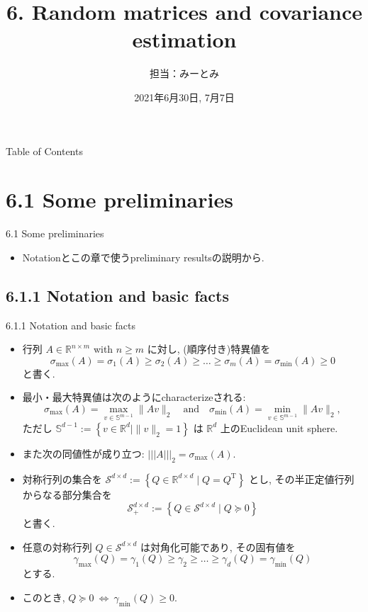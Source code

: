 \documentclass[unicode,aspectratio=169,11pt]{beamer}
\title{6. Random matrices and covariance estimation}
\author{担当：みーとみ}
\date{2021年6月30日, 7月7日}
\newcommand{\bb}{\mathbb}
\newcommand{\cc}{\mathcal}
\newcommand{\tr}{\mathrm{T}}
\begin{document}
\maketitle

\begin{frame}{Table of Contents}{}
    \setcounter{tocdepth}{1}
    \tableofcontents
\end{frame}

\section{6.1 Some preliminaries}
\begin{frame}{6.1 Some preliminaries}
  \begin{itemize}
    \item Notationとこの章で使うpreliminary resultsの説明から.
  \end{itemize}
\end{frame}

\subsection{6.1.1 Notation and basic facts}
\begin{frame}{6.1.1 Notation and basic facts}{}
  \begin{itemize}
    \item 行列 $A \in \bb{R}^{n \times m}$ with $n \ge m$ に対し, (順序付き)特異値を
    \[ \sigma_{\max}(A) = \sigma_1(A) \ge \sigma_2(A) \ge \dots \ge \sigma_m(A) = \sigma_{\min}(A) \ge 0 \]
    と書く.
    \item 最小・最大特異値は次のようにcharacterizeされる:
    \[ \sigma_{\max}(A) = \max_{v \in \bb{S}^{m-1}}\| Av \|_2 \quad \mathrm{and} \quad \sigma_{\min}(A) = \min_{v \in \bb{S}^{m-1}}\|Av\|_2, \tag{6.1} \]
    ただし $\bb{S}^{d-1} := \left\{ v \in \bb{R}^d \mid \|v\|_2 = 1 \right\}$ は $\bb{R}^d$ 上のEuclidean unit sphere.
    \item また次の同値性が成り立つ: $||| A |||_2 = \sigma_{\max}(A)$.
  \end{itemize}
\end{frame}

\begin{frame}
  \begin{itemize}
    \item 対称行列の集合を ${\cc{S}}^{d\times d} := \left\{Q\in\bb{R}^{d\times d} \mid Q = Q^\tr\right\}$ とし, その半正定値行列からなる部分集合を
    \[ \cc{S}_+^{d \times d} := \left\{Q \in \cc{S}^{d \times d} \mid Q \succeq 0\right\} \tag{6.2} \]
    と書く.
    \item 任意の対称行列 $Q \in \cc{S}^{d\times d}$ は対角化可能であり, その固有値を
    \[ \gamma_{\max}(Q) = \gamma_1(Q) \ge \gamma_2 \ge \dots \ge \gamma_d(Q) = \gamma_{\min}(Q) \]
    とする.
    \item このとき, $Q \succeq 0 \ \Leftrightarrow \ \gamma_{\min}(Q) \ge 0$.
  \end{itemize}
\end{frame}
\end{document}
